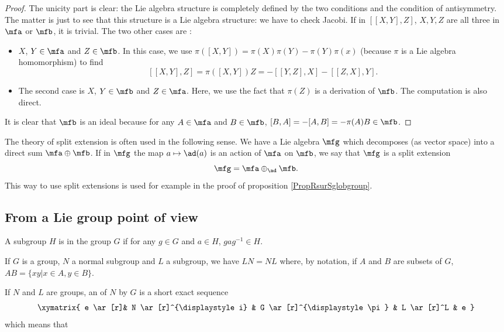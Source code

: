 \begin{proof}
    The unicity part is clear: the Lie algebra structure is completely defined by the two conditions and the condition of antisymmetry. The matter is just to see that this structure is a Lie algebra structure: we have to check Jacobi. If in $[[X,Y],Z]$, $X,Y,Z$ are all three in $\mfa$ or $\mfb$, it is trivial. The two other cases are  :
    \begin{itemize}
    \item $X$, $Y\in\mfa$ and $Z\in\mfb$. In this case, we use $\pi([X,Y])=\pi(X)\pi(Y)-\pi(Y)\pi(x)$ (because $\pi$ is a Lie algebra homomorphism) to find
    \[
    [[X,Y],Z]=\pi([X,Y])Z=-[[Y,Z],X]-[[Z,X],Y].
    \]

    \item The second case is $X$, $Y\in\mfb$ and $Z\in\mfa$. Here, we use the fact that $\pi(Z)$ is a derivation of $\mfb$. The computation is also direct.
    \end{itemize}

    It is clear that $\mfb$ is an ideal because for any $A\in\mfa$ and $B\in\mfb$, $[B,A]=-[A,B]=-\pi(A)B\in\mfb$.

\end{proof}

The theory of split extension is often used in the following sense. We have a Lie algebra $\mfg$ which decomposes (as vector space) into a direct sum $\mfa\oplus\mfb$. If in $\mfg$ the map $a\mapsto \ad(a)$ is an action of $\mfa$ on $\mfb$, we say that $\mfg$ is a split extension
\[ 
  \mfg=\mfa\oplus_{\ad}\mfb.
\]
This way to use split extensions is used for example in the proof of proposition \ref{PropRsurSglobgroup}.


\subsection{From a Lie group point of view}


\begin{definition}
A subgroup $H$ is  in the group $G$ if for any $g\in G$ and $a\in H$, $gag^{-1}\in H$.
\end{definition}

If $G$ is a group, $N$ a normal subgroup and $L$ a subgroup, we have $LN=NL$ where, by notation, if $A$ and $B$ are subsets of $G$, $AB=\{xy|x\in A,y\in B\}$. 

If $N$ and $L$ are groups, an  of $N$ by $G$ is a short exact sequence
\begin{equation}
\xymatrix{ e \ar[r]& N \ar[r]^{\displaystyle i} & G \ar[r]^{\displaystyle \pi} & L \ar[r]^L  & e }
\end{equation}
which means that

